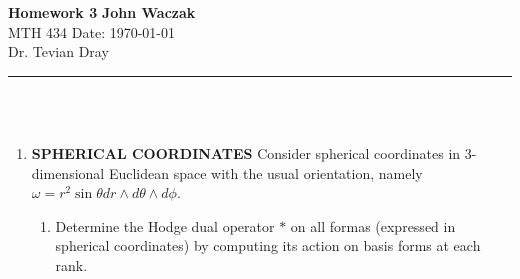 \documentclass[a4paper, 11pt]{article}
\begin{document}
\noindent
\large\textbf{Homework 3} \hfill \textbf{John Waczak} \\
\normalsize MTH 434 \hfill  Date: \today \\
Dr. Tevian Dray
\par\noindent\rule{\textwidth}{0.4pt} \\\\



\begin{enumerate}[leftmargin=0em]
\item \textbf{SPHERICAL COORDINATES} Consider spherical coordinates in 3-dimensional Euclidean space with the usual orientation, namely $\omega = r^2\sin\theta dr\wedge d\theta \wedge d\phi$.
  \begin{enumerate}[leftmargin=3em, label=(\alph*)]
  \item Determine the Hodge dual operator $*$ on all formas (expressed in spherical coordinates) by computing its action on basis forms at each rank.\\


\end{enumerate}
\end{enumerate}
\end{document}
